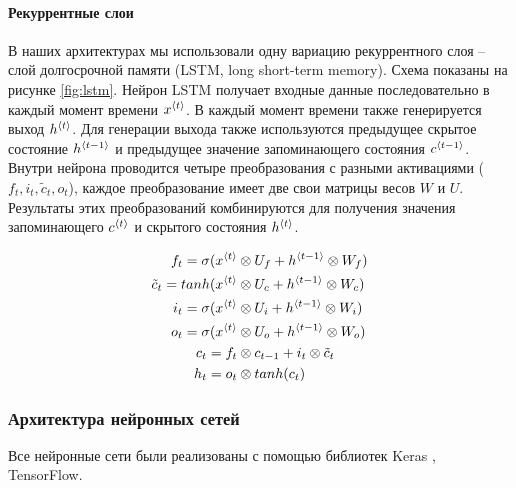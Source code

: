 \paragraph{Рекуррентные слои} В наших архитектурах мы использовали одну вариацию рекуррентного слоя -- слой долгосрочной памяти (LSTM, long short-term memory)\cite{gers_learning_2006}. Схема показаны на рисунке \ref{fig:lstm}. Нейрон LSTM получает входные данные последовательно в каждый момент времени $x^{\langle t \rangle}$. В каждый момент времени также генерируется выход $h^{\langle t \rangle}$. Для генерации выхода также используются предыдущее скрытое состояние $h^{\langle t-1 \rangle}$ и предыдущее значение запоминающего состояния $c^{\langle t-1 \rangle}$. Внутри нейрона проводится четыре преобразования с разными активациями ($f_t, i_t, \tilde c_t, o_t$), каждое преобразование имеет две свои матрицы весов $W$ и $U$. Результаты этих преобразований комбинируются для получения значения запоминающего $c^{\langle t \rangle}$ и скрытого состояния $h^{\langle t \rangle}$.


\begin{figure*}[h]
	\centering
	\begin{subfigure}[c]{0.5\textwidth}
		
	\end{subfigure}	
	\begin{subfigure}[c]{0.45\textwidth}
		\begin{align}
	f_t = \sigma (x^{\langle t \rangle} &\otimes U_f + h^{\langle t-1 \rangle} \otimes W_f)\\
	\tilde c_t = tanh (x^{\langle t \rangle} &\otimes U_c + h^{\langle t-1 \rangle} \otimes W_c)\\
	i_t = \sigma (x^{\langle t \rangle} &\otimes U_i + h^{\langle t-1 \rangle} \otimes W_i)\\
	o_t = \sigma (x^{\langle t \rangle} &\otimes U_o + h^{\langle t-1 \rangle} \otimes W_o)\\
	c_t = f_t &\otimes c_{t-1} + i_t \otimes \tilde c_t \\
	h_t = o_t &\otimes tanh(c_t)
	\end{align}
	\end{subfigure}
	\caption{{\bfseries LSTM слой.} \\*
	$\otimes$ - поэлементное умножение, $+$ - поэлементное сложение. }
	\label{fig:lstm}
\end{figure*}

\subsubsection{Архитектура нейронных сетей}
Все нейронные сети были реализованы с помощью библиотек Keras\cite{chollet_keras_2015} , TensorFlow.

